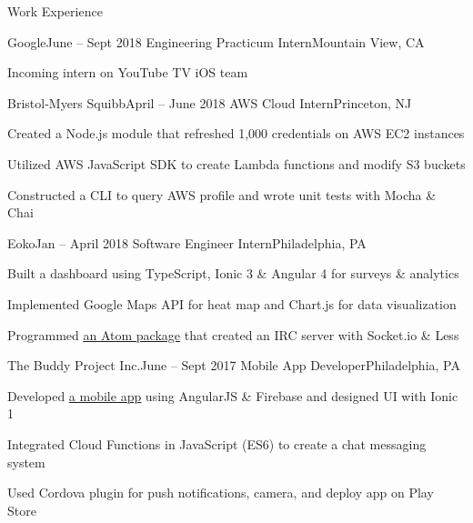 \documentclass{resume} %
\begin{document}
\begin{rSection}{Work Experience}
\begin{rSubsection}{Google}{June -- Sept 2018}
{Engineering Practicum Intern}{Mountain View, CA}
\item Incoming intern on YouTube TV iOS team  
\end{rSubsection}

\begin{rSubsection}{Bristol-Myers Squibb}{April -- June 2018}
{AWS Cloud Intern}{Princeton, NJ}
\item Created a Node.js module that refreshed 1,000 credentials on AWS EC2 instances 
\item Utilized AWS JavaScript SDK to create Lambda functions and modify S3 buckets 
\item Constructed a CLI to query AWS profile and wrote unit tests with Mocha \& Chai

\end{rSubsection}


\begin{rSubsection}{Eoko}{Jan -- April 2018}
{Software Engineer Intern}{Philadelphia, PA} 
\item Built a dashboard using TypeScript, Ionic 3 \& Angular 4 for surveys \& analytics 
\item Implemented Google Maps API for heat map and Chart.js for data visualization
\item Programmed \href{https://github.com/cassandrale179/atom-chat-plugin}{\underline {an Atom package}} that created an IRC server with Socket.io \& Less 
\end{rSubsection}

\begin{rSubsection}{The Buddy Project Inc.}{June -- Sept 2017}
{Mobile App Developer}{Philadelphia, PA}
\item Developed \href{https://play.google.com/store/apps/details?id=buddy.project.com}{\underline{a mobile app}} using AngularJS \& Firebase and designed UI with Ionic 1 
\item Integrated Cloud Functions in JavaScript (ES6) to create a chat messaging system 
\item Used Cordova plugin for push notifications, camera, and deploy app on Play Store
\end{rSubsection}
\end{rSection}


\end{document}
